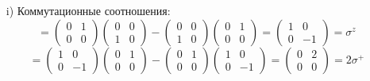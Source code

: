 \documentclass[12pt]{article}
\theoremstyle{definition}
\begin{document}
\begin{enumerate}
    \begin{itemize}
        \item[i)] Коммутационные соотношения:
        \begin{equation}
            [\sigma^+,\sigma^-]=\begin{pmatrix}
                0 & 1\\
                0 & 0
            \end{pmatrix}\begin{pmatrix}
                0 & 0\\
                1 & 0
            \end{pmatrix}-\begin{pmatrix}
                0 & 0\\
                1 & 0
            \end{pmatrix}\begin{pmatrix}
                0 & 1\\
                0 & 0
            \end{pmatrix}=\begin{pmatrix}
                1 & 0\\
                0 & -1
            \end{pmatrix}=\sigma^z
        \end{equation}
        \begin{equation}
            [\sigma^z,\sigma^+]=\begin{pmatrix}
                1 & 0\\
                0 & -1
            \end{pmatrix}\begin{pmatrix}
                0 & 1\\
                0 & 0
            \end{pmatrix}-\begin{pmatrix}
                0 & 1\\
                0 & 0
            \end{pmatrix}\begin{pmatrix}
                1 & 0\\
                0 & -1
            \end{pmatrix}=\begin{pmatrix}
                0 & 2\\
                0 & 0
            \end{pmatrix}=2\sigma^+
        \end{equation}
        \begin{equation}

\end{equation}
\end{itemize}
\end{enumerate}
\end{document}
